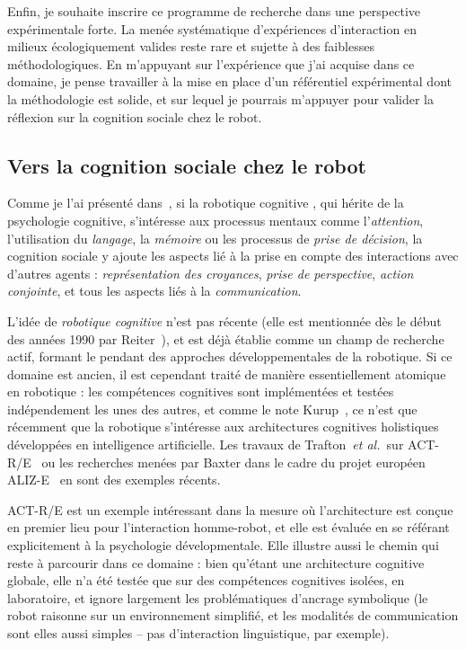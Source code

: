 \documentclass[a4paper]{article}
\newcommand{\etal}{{\textit{et al.~}}}
\begin{document}
Enfin, je souhaite inscrire ce programme de recherche dans une perspective
expérimentale forte. La menée systématique d'expériences d'interaction en milieux
écologiquement valides reste rare et sujette à des faiblesses méthodologiques.
En m'appuyant sur l'expérience que j'ai acquise dans ce domaine, je pense
travailler à la mise en place d'un référentiel expérimental dont la méthodologie
est solide, et sur lequel je pourrais m'appuyer pour valider la réflexion sur la
cognition sociale chez le robot.

\subsection{Vers la cognition sociale chez le robot}

Comme je l'ai présenté dans~\cite{lemaignan2014human}, si la robotique cognitive
, qui hérite de la psychologie cognitive, s'intéresse aux processus mentaux
comme l'\emph{attention}, l'utilisation du \emph{langage}, la \emph{mémoire} ou
les processus de \emph{prise de décision}, la cognition sociale y ajoute les
aspects lié à la prise en compte des interactions avec d'autres agents :
\emph{représentation des croyances}, \emph{prise de perspective}, \emph{action
conjointe}, et tous les aspects liés à la \emph{communication}.

L'idée de \emph{robotique cognitive} n'est pas récente (elle est mentionnée dès
le début des années 1990 par Reiter~\cite{Levesque2008}), et est déjà établie
comme un champ de recherche actif, formant le pendant des approches
développementales de la robotique. Si ce domaine est ancien, il est cependant
traité de manière essentiellement atomique en robotique : les compétences
cognitives sont implémentées et testées indépendement les unes des autres, et
comme le note Kurup~\cite{kurup2012what}, ce n'est que récemment que la
robotique s'intéresse aux architectures cognitives holistiques développées en
intelligence artificielle. Les travaux de Trafton~\etal sur
ACT-R/E~\cite{trafton2013act} ou les recherches menées par Baxter dans le cadre
du projet européen ALIZ-E~\cite{baxter2013cognitive} en sont des exemples
récents.

ACT-R/E est un exemple intéressant dans la mesure où l'architecture est conçue
en premier lieu pour l'interaction homme-robot, et elle est évaluée en se
référant explicitement à la psychologie dévelopmentale. Elle illustre aussi le
chemin qui reste à parcourir dans ce domaine : bien qu'étant une architecture
cognitive globale, elle n'a été testée que sur des compétences cognitives
isolées, en laboratoire, et ignore largement les problématiques d'ancrage
symbolique (le robot raisonne sur un environnement simplifié, et les modalités
de communication sont elles aussi simples -- pas d'interaction linguistique, par
exemple).
\end{document}
